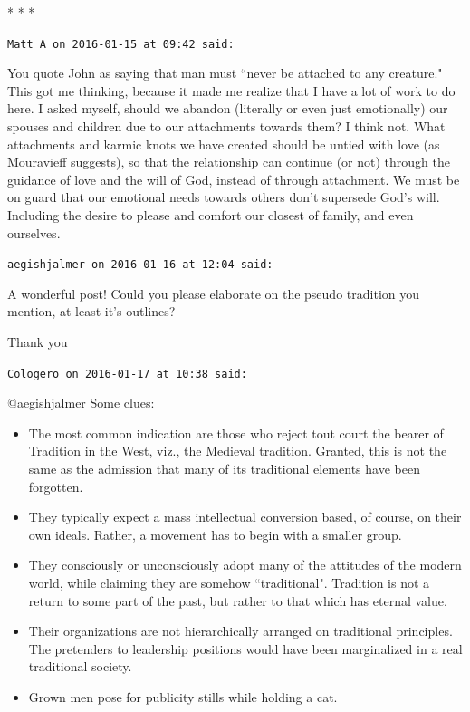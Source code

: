 
\begin{center}* * *\end{center}

\begin{footnotesize}\begin{sffamily}



\texttt{Matt A on 2016-01-15 at 09:42 said: }

You quote John as saying that man must ``never be attached to any creature." This got me thinking, because it made me realize that I have a lot of work to do here. I asked myself, should we abandon (literally or even just emotionally) our spouses and children due to our attachments towards them? I think not. What attachments and karmic knots we have created should be untied with love (as Mouravieff suggests), so that the relationship can continue (or not) through the guidance of love and the will of God, instead of through attachment. We must be on guard that our emotional needs towards others don't supersede God's will. Including the desire to please and comfort our closest of family, and even ourselves.


\hfill

\texttt{aegishjalmer on 2016-01-16 at 12:04 said: }

A wonderful post! Could you please elaborate on the pseudo tradition you mention, at least it's outlines?

Thank you


\hfill

\texttt{Cologero on 2016-01-17 at 10:38 said: }

@aegishjalmer Some clues:

\begin{itemize}
\item The most common indication are those who reject tout court the bearer of Tradition in the West, viz., the Medieval tradition. Granted, this is not the same as the admission that many of its traditional elements have been forgotten. 
\item They typically expect a mass intellectual conversion based, of course, on their own ideals. Rather, a movement has to begin with a smaller group. 
\item They consciously or unconsciously adopt many of the attitudes of the modern world, while claiming they are somehow ``traditional". Tradition is not a return to some part of the past, but rather to that which has eternal value. 
\item Their organizations are not hierarchically arranged on traditional principles. The pretenders to leadership positions would have been marginalized in a real traditional society. 
\item Grown men pose for publicity stills while holding a cat. 
\end{itemize}


\end{sffamily}
\end{footnotesize}
